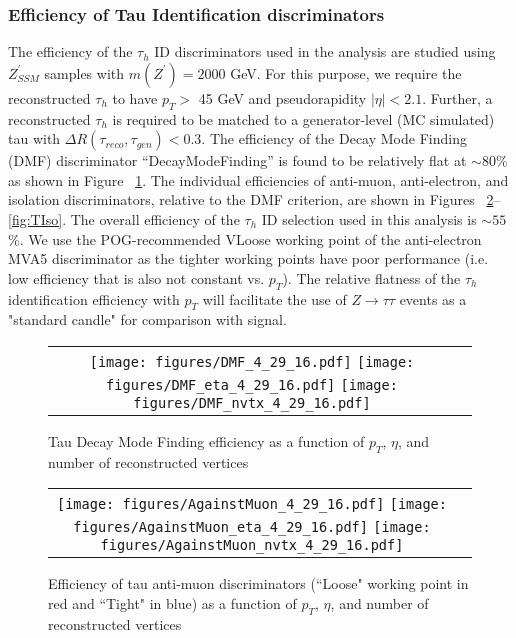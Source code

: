 \subsubsection{Efficiency of Tau Identification discriminators} \label{sec:tauIDeff}
The efficiency of the $\tau_{h}$ ID discriminators used in the analysis are studied using $Z^{\prime}_{SSM}$ samples with $m(Z^{\prime}) = 2000$ GeV. For this purpose, we require the reconstructed $\tau_{h}$ to have $p_{T} >$ 45 GeV and pseudorapidity $|\eta| < 2.1$. Further, a reconstructed $\tau_{h}$ is required to be matched to a generator-level (MC simulated) tau with $\Delta R(\tau_{reco},\tau_{gen}) < 0.3$. The efficiency of the Decay Mode Finding (DMF) discriminator  ``DecayModeFinding'' is found to be relatively flat at $\sim 80$\% as shown in Figure ~\ref{fig:DMF}. The individual efficiencies of anti-muon, anti-electron, and isolation discriminators, relative to the DMF criterion, are shown in Figures ~\ref{fig:ML3}--\ref{fig:TIso}. The overall efficiency of the $\tau_{h}$ ID selection used in this analysis is $\sim 55$\%. We use the POG-recommended VLoose working point of the anti-electron MVA5 discriminator as the tighter working points have poor performance (i.e. low efficiency that is also not constant vs. $p_{T}$). The relative flatness of the $\tau_{h}$ identification efficiency with $p_{T}$ will facilitate the use of $Z\rightarrow\tau\tau$ events as a "standard candle" for comparison with signal. 

\begin{figure}[tbh!]
    \centering
    \begin{tabular}{cc}
      \texttt{[image: figures/DMF\_4\_29\_16.pdf]}
      \texttt{[image: figures/DMF\_eta\_4\_29\_16.pdf]}
       \texttt{[image: figures/DMF\_nvtx\_4\_29\_16.pdf]}
    \end{tabular}
    \caption{Tau Decay Mode Finding efficiency as a function of $p_{T}$, $\eta$, and number of reconstructed vertices}
    \label{fig:DMF}
  \end{figure}
 
\begin{figure}[tbh!]
    \centering
    \begin{tabular}{cc}
      \texttt{[image: figures/AgainstMuon\_4\_29\_16.pdf]}
      \texttt{[image: figures/AgainstMuon\_eta\_4\_29\_16.pdf]}
       \texttt{[image: figures/AgainstMuon\_nvtx\_4\_29\_16.pdf]}
    \end{tabular}
    \caption{Efficiency of tau anti-muon discriminators (``Loose" working point in red and ``Tight" in blue) as a function of $p_{T}$, $\eta$, and number of reconstructed vertices}
    \label{fig:ML3}
  \end{figure}


